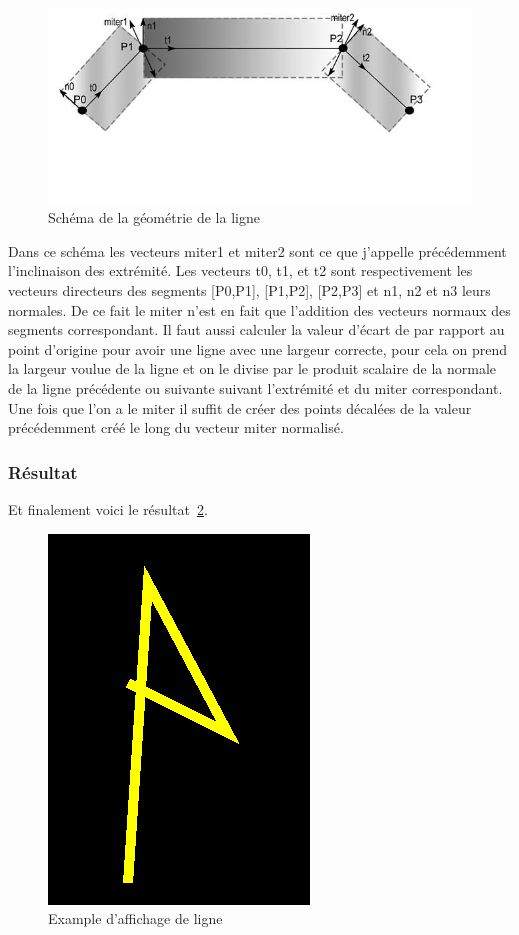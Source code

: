 \documentclass[12pt]{article}
\begin{document}
\begin{figure}[htp]
  \centering
  \includegraphics[scale=0.8]{images/line_geom}
  \caption{Schéma de la géométrie de la ligne}
  \label{fig:geom_line}
\end{figure}

Dans ce schéma les vecteurs miter1 et miter2 sont ce que j’appelle précédemment l’inclinaison des extrémité. Les vecteurs t0, t1, et t2 sont respectivement les vecteurs directeurs des segments [P0,P1], [P1,P2], [P2,P3] et n1, n2 et n3 leurs normales. De ce fait le miter n’est en fait que l’addition des vecteurs normaux des segments correspondant. Il faut aussi calculer la valeur d’écart de par rapport au point d’origine pour avoir une ligne avec une largeur correcte, pour cela on prend la largeur voulue de la ligne et on le divise par le produit scalaire de la normale de la ligne précédente ou suivante suivant l’extrémité et du miter correspondant. Une fois que l’on a le miter il suffit de créer des points décalées de la valeur précédemment créé le long du vecteur miter normalisé.

\subsubsection{Résultat}
Et finalement voici le résultat~\ref{fig:line}.
\begin{figure}[htp]
  \centering
  \includegraphics[scale=0.8]{images/line_example}
  \caption{Example d'affichage de ligne}
  \label{fig:line}
\end{figure}
\end{document}
